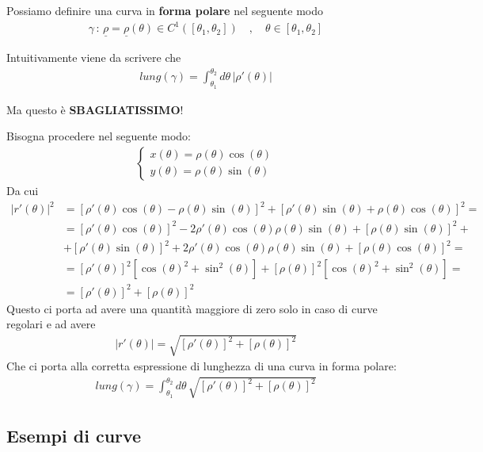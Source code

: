 Possiamo definire una curva in \textbf{forma polare} nel seguente modo
\begin{align}
\gamma \, : \, \underline{\rho}=\underline{\rho}(\theta)\in C^1([\theta_1,\theta_2]) \quad , \quad \theta \in [\theta_1,\theta_2]
\end{align}

Intuitivamente viene da scrivere che
\begin{align}
lung(\gamma)= \int_{\theta_1}^{\theta_2} d\theta \, |\rho'(\theta)|
\end{align}

Ma questo è \textbf{SBAGLIATISSIMO}!


Bisogna procedere nel seguente modo:
\begin{align}
\left\{
\begin{array}{cc}
x(\theta)=\rho(\theta) \cos(\theta)\\
y(\theta)=\rho(\theta) \sin(\theta)
\end{array}
\right.
\end{align}
Da cui
\begin{align}
|r'(\theta)|^2{}&= [ \rho'(\theta) \cos(\theta) - \rho(\theta) \sin(\theta) ]^2+ [\rho'(\theta) \sin(\theta) + \rho(\theta) \cos(\theta)]^2 = \nonumber \\
&= [\rho'(\theta) \cos(\theta)]^2 - 2\rho'(\theta) \cos(\theta) \rho(\theta) \sin(\theta) + [\rho(\theta) \sin(\theta) ]^2 + \nonumber \\
&+ [\rho'(\theta) \sin(\theta)]^2 + 2\rho'(\theta) \cos(\theta) \rho(\theta) \sin(\theta) + [\rho(\theta) \cos(\theta) ]^2 = \nonumber \\
&= [\rho'(\theta)]^2 [\cos(\theta)^2 + \sin^2(\theta)] + [\rho(\theta)]^2 [\cos(\theta)^2 + \sin^2(\theta)] = \nonumber \\
&= [\rho'(\theta)]^2 + [\rho(\theta)]^2
\end{align}
Questo ci porta ad avere una quantità maggiore di zero solo in caso di curve regolari e ad avere
\begin{align}
|r'(\theta)| = \sqrt{[\rho'(\theta)]^2 + [\rho(\theta)]^2}
\end{align}
Che ci porta alla corretta espressione di lunghezza di una curva in forma polare:
\begin{align}
lung(\gamma)= \int_{\theta_1}^{\theta_2} d\theta \, \sqrt{[\rho'(\theta)]^2 + [\rho(\theta)]^2}
\end{align}

\subsection{Esempi di curve}

